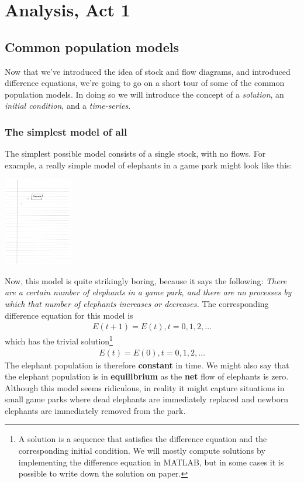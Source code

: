 \chapter{Analysis, Act 1}

\section{Common population models}

Now that we've introduced the idea of stock and flow diagrams, and introduced difference equations, we're going to go on a short tour of some of the common population models. In doing so we will introduce the concept of a 
{\it solution}, 
an {\it initial condition}, and a {\it time-series}.
\subsection{The simplest model of all}

The simplest possible model consists of a single stock, with no flows.  For example, a really simple model of elephants in a game park might look like this:

\centerline{\includegraphics[width=3cm]{figs/simple_model}}

Now, this model is quite strikingly boring, because it says the following:  {\it There are a certain number of elephants in a game park, and there are no processes by which that number of elephants increases or decreases.}  The corresponding difference equation for this model is
\begin{eqnarray*}
E(t+1) = E(t), t = 0, 1, 2, \ldots
\end{eqnarray*}
which has the trivial solution\footnote{A solution is a sequence that satisfies the difference equation and the corresponding initial condition. We will mostly compute solutions by implementing the difference equation in MATLAB, but in some cases it is possible to write down the solution on paper.}
\begin{eqnarray*}
E(t) = E(0), t = 0, 1, 2, \ldots
\end{eqnarray*}
The elephant population is therefore {\bf constant} in time. We might also say that the elephant population is in {\bf equilibrium} as the {\bf net} flow of elephants is zero. Although this model seems ridiculous, in reality it might capture situations in small game parks where dead elephants are immediately replaced and newborn elephants are immediately removed from the park.

